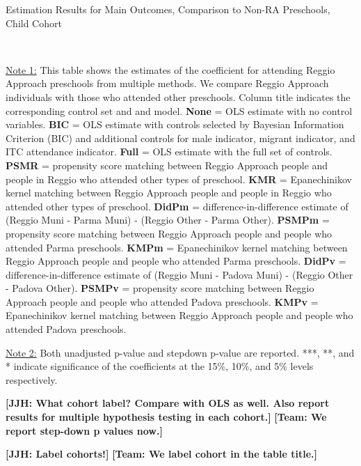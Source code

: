 \begin{table}[H] \caption{Estimation Results for Main Outcomes, Comparison to Non-RA Preschools, Child Cohort} \label{ols-M-child-reg-pres}
\scalebox{0.59}{}
\vspace{1ex} \\
\footnotesize\raggedright{\underline{Note 1:} This table shows the estimates of the coefficient for attending Reggio Approach preschools from multiple methods. We compare Reggio Approach individuals with those who attended other preschools. Column title indicates the corresponding control set and and model. \textbf{None} = OLS estimate with no control variables. \textbf{BIC} = OLS estimate with controls selected by Bayesian Information Criterion (BIC) and additional controls for male indicator, migrant indicator, and ITC attendance indicator. \textbf{Full} = OLS estimate with the full set of controls. \textbf{PSMR} =  propensity score matching between Reggio Approach people and people in Reggio who attended other types of preschool. \textbf{KMR} = Epanechinikov kernel matching between Reggio Approach people and people in Reggio who attended other types of preschool. \textbf{DidPm} = difference-in-difference estimate of (Reggio Muni - Parma Muni) - (Reggio Other - Parma Other). \textbf{PSMPm} = propensity score matching between Reggio Approach people and people who attended Parma preschools. \textbf{KMPm} = Epanechinikov kernel matching between Reggio Approach people and people who attended Parma preschools. \textbf{DidPv} = difference-in-difference estimate of (Reggio Muni - Padova Muni) - (Reggio Other - Padova Other). \textbf{PSMPv} = propensity score matching between Reggio Approach people and people who attended Padova preschools. \textbf{KMPv} = Epanechinikov kernel matching between Reggio Approach people and people who attended Padova preschools.} 

\footnotesize\raggedright{\underline{Note 2:} Both unadjusted p-value and stepdown p-value are reported. ***, **, and * indicate significance of the coefficients at the 15\%, 10\%, and 5\% levels respectively.}

\end{table}

\textbf{[JJH: What cohort label? Compare with OLS as well. Also report results for multiple hypothesis testing in each cohort.]} \textbf{[Team: We report step-down p values now.]}

\textbf{[JJH: Label cohorts!]} \textbf{[Team: We label cohort in the table title.]}


